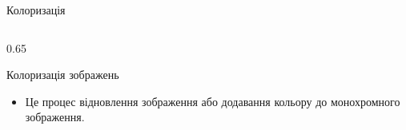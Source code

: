 \begin{frame}{Колоризація}
        \begin{columns}[T]
            \begin{column}{0.65\textwidth}

                

                \begin{block}{Колоризація зображень}
                    \begin{itemize}
                        \item Це процес відновлення зображення або додавання кольору до монохромного зображення.
                    \end{itemize}
                \end{block}
                

\end{column}
\end{columns}
\end{frame}
